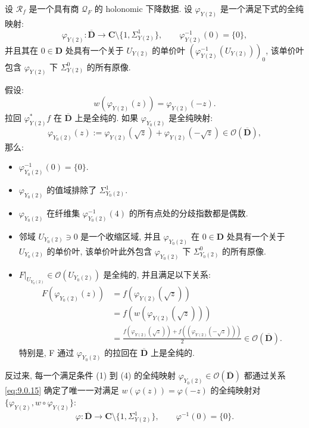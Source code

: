 \begin{lemma}\label{lem:9.0.13}
设 \(\mathcal{R}_f\) 是一个具有商 \(\mathcal{Q}_F\) 的 holonomic 下降数据. 
设 \(\varphi_{Y(2)}\) 是一个满足下式的全纯映射:
\[ \varphi_{Y(2)}: \overline{\mathbf{D}} \to \mathbf{C} \setminus \{1, \Sigma^1_{Y(2)}\}, \qquad \varphi^{-1}_{Y(2)}(0) = \{0\}, \]
并且其在 \(0 \in \mathbf{D}\) 处具有一个关于 \(U_{Y(2)}\) 的单价叶 \(\left(\varphi_{Y(2)}^{-1}\left(U_{Y(2)}\right)\right)_0\), 
该单价叶包含 \(\varphi_{Y(2)}\) 下 \(\Sigma_{Y(2)}^0\) 的所有原像.

假设:
\begin{equation}\label{eq:9.0.14}
w(\varphi_{Y(2)}(z)) = \varphi_{Y(2)}(-z).
\end{equation}
拉回 \(\varphi_{Y(2)}^*f\) 在 \(\overline{\mathbf{D}}\) 上是全纯的. 
如果 \(\varphi_{Y_0(2)}\) 是全纯映射:
\begin{equation}\label{eq:9.0.15}
\varphi_{Y_0(2)}(z) := \varphi_{Y(2)}\left(\sqrt{z}\right) + \varphi_{Y(2)}\left(-\sqrt{z}\right) \in \mathcal{O}(\overline{\mathbf{D}}),
\end{equation}
那么:
\begin{itemize}
  \item[(1)] \(\varphi_{Y_0(2)}^{-1}(0) = \{0\}.\)
  \item[(2)] \(\varphi_{Y_0(2)}\) 的值域排除了 \(\Sigma^1_{Y_0(2)}\).
  \item[(3)] \(\varphi_{Y_0(2)}\) 在纤维集 \(\varphi_{Y_0(2)}^{-1}(4)\) 的所有点处的分歧指数都是偶数.
  \item[(4)] 邻域 \(U_{Y_0(2)} \ni 0\) 是一个收缩区域, 并且 \(\varphi_{Y_0(2)}\) 在 \(0 \in \mathbf{D}\) 处具有一个关于 \(U_{Y_0(2)}\) 的单价叶, 
  该单价叶此外包含 \(\varphi_{Y_0(2)}\) 下 \(\Sigma_{Y_0(2)}^0\) 的所有原像.
  \item[(5)] \(F|_{U_{Y_0(2)}} \in \mathcal{O}\left(U_{Y_0(2)}\right)\) 是全纯的, 并且满足以下关系:
  \begin{equation}\label{eq:9.0.16}
  \begin{aligned}
  F\left(\varphi_{Y_0(2)}(z)\right) 
  &= f\left(\varphi_{Y(2)}(\sqrt{z})\right) \\
  &= f\left(w\left(\varphi_{Y(2)}(\sqrt{z})\right)\right) \\
  &= \frac{f\left(\varphi_{Y(2)}(\sqrt{z})\right) + f\left(\left(\varphi_{Y(2)}(-\sqrt{z})\right)\right)}{2} \in \mathcal{O}(\overline{\mathbf{D}}).
  \end{aligned}
  \end{equation}
  特别是, F 通过 \(\varphi_{Y_0(2)}\) 的拉回在 \(\overline{\mathbf{D}}\) 上是全纯的.
\end{itemize}
反过来, 每一个满足条件 (1) 到 (4) 的全纯映射 \(\varphi_{Y_0(2)} \in \mathcal{O}(\overline{\mathbf{D}})\) 
都通过关系 \eqref{eq:9.0.15} 确定了唯一一对满足 \(w(\varphi(z)) = \varphi(-z)\) 
的全纯映射对 \(\{\varphi_{Y(2)}, w \circ \varphi_{Y(2)}\}\):
\[ \varphi: \overline{\mathbf{D}} \to \mathbf{C} \setminus \{1, \Sigma_{Y(2)}^1\}, \qquad \varphi^{-1}(0) = \{0\}. \]
\end{lemma}


